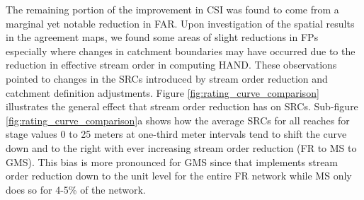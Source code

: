 \documentclass[draft]{dependencies/agujournal2019}
\begin{document}
The remaining portion of the improvement in CSI was found to come from a marginal yet notable reduction in FAR.
Upon investigation of the spatial results in the agreement maps, we found some areas of slight reductions in FPs especially where changes in catchment boundaries may have occurred due to the reduction in effective stream order in computing HAND.
These observations pointed to changes in the SRCs introduced by stream order reduction and catchment definition adjustments.
Figure \ref{fig:rating_curve_comparison} illustrates the general effect that stream order reduction has on SRCs.
Sub-figure \ref{fig:rating_curve_comparison}a shows how the average SRCs for all reaches for stage values 0 to 25 meters at one-third meter intervals tend to shift the curve down and to the right with ever increasing stream order reduction (FR to MS to GMS). 
This bias is more pronounced for GMS since that implements stream order reduction down to the unit level for the entire FR network while MS only does so for 4-5\% of the network.
\end{document}
